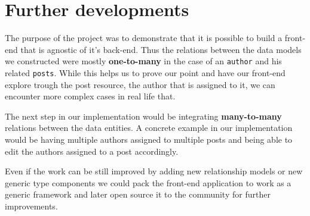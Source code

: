\section{Further developments}
\label{sec:further-developments}

The purpose of the project was to demonstrate that it is possible to build a front-end that is agnostic of it's back-end. Thus the relations between the data models we constructed were mostly \textbf{one-to-many} in the case of an \texttt{author} and his related \texttt{posts}. While this helps us to prove our point and have our front-end explore trough the post resource, the author that is assigned to it, we can encounter more complex cases in real life that.

The next step in our implementation would be integrating \textbf{many-to-many} relations between the data entities. A concrete example in our implementation would be having multiple authors assigned to multiple posts and being able to edit the authors assigned to a post accordingly.

Even if the work can be still improved by adding new relationship models or new generic type components we could pack the front-end application to work as a generic framework and later open source it to the community for further improvements.